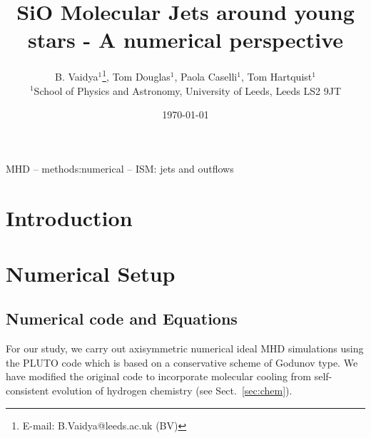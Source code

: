\documentclass[useAMS,usenatbib,letters]{mn2e}
\begin{document}
\title{SiO Molecular Jets around young stars - A numerical perspective}
\author[B. Vaidya, Tom Douglas, Paola Caselli, Tom Hartquist]{B. Vaidya$^{1}$\thanks{E-mail:
B.Vaidya@leeds.ac.uk (BV)}, Tom Douglas$^{1}$, Paola Caselli$^{1}$, Tom Hartquist$^{1}$\\
$^{1}$School of Physics and Astronomy, University of Leeds, Leeds LS2
9JT\\
}

\date\today

\pagerange{\pageref{firstpage}--\pageref{lastpage}} 


\maketitle

\label{firstpage}

\begin{abstract}
  {}  
   {}
   {}
   {}
\end{abstract}

   \begin{keywords}
    MHD -- methods:numerical -- ISM: jets and outflows
   \end{keywords}


%
%


\section{Introduction} 

\section{Numerical Setup}
\subsection{Numerical code and Equations}
For our study, we carry out axisymmetric numerical ideal MHD simulations using the PLUTO code \citep{Mignone:2007p644} which is based on a conservative scheme of Godunov type.
We have modified the original code to incorporate molecular cooling
from self-consistent evolution of hydrogen chemistry (see Sect.~\ref{sec:chem}).
\end{document}
